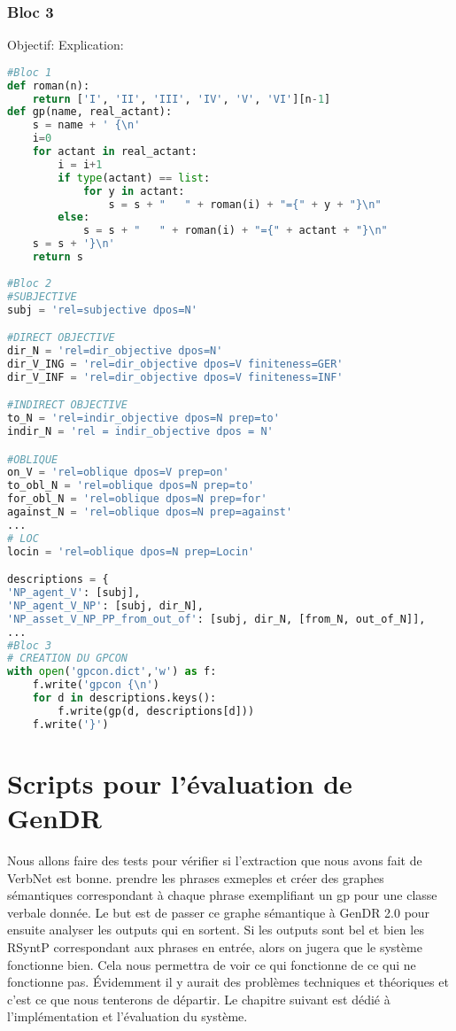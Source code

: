 \subsubsection{Bloc 3}
Objectif:
Explication:

\begin{lstlisting}[language=Python, caption = code pour gpcon.dict]
#Bloc 1
def roman(n):
    return ['I', 'II', 'III', 'IV', 'V', 'VI'][n-1]
def gp(name, real_actant):
    s = name + ' {\n'
    i=0
    for actant in real_actant:
        i = i+1
        if type(actant) == list:
            for y in actant:
                s = s + "   " + roman(i) + "={" + y + "}\n"
        else:
            s = s + "   " + roman(i) + "={" + actant + "}\n"
    s = s + '}\n'
    return s
		
#Bloc 2
#SUBJECTIVE
subj = 'rel=subjective dpos=N'

#DIRECT OBJECTIVE
dir_N = 'rel=dir_objective dpos=N'
dir_V_ING = 'rel=dir_objective dpos=V finiteness=GER'
dir_V_INF = 'rel=dir_objective dpos=V finiteness=INF'

#INDIRECT OBJECTIVE
to_N = 'rel=indir_objective dpos=N prep=to'
indir_N = 'rel = indir_objective dpos = N'

#OBLIQUE
on_V = 'rel=oblique dpos=V prep=on'
to_obl_N = 'rel=oblique dpos=N prep=to' 
for_obl_N = 'rel=oblique dpos=N prep=for'
against_N = 'rel=oblique dpos=N prep=against'
...
# LOC
locin = 'rel=oblique dpos=N prep=Locin'

descriptions = {
'NP_agent_V': [subj],
'NP_agent_V_NP': [subj, dir_N],
'NP_asset_V_NP_PP_from_out_of': [subj, dir_N, [from_N, out_of_N]],
...
#Bloc 3
# CREATION DU GPCON
with open('gpcon.dict','w') as f:
    f.write('gpcon {\n')
    for d in descriptions.keys():
        f.write(gp(d, descriptions[d]))
    f.write('}')
\end{lstlisting}

\section{Scripts pour l'évaluation de GenDR}

Nous allons faire des tests pour vérifier si l'extraction que nous avons fait de VerbNet est bonne. prendre les phrases exmeples et créer des graphes sémantiques correspondant à chaque phrase exemplifiant un gp pour une classe verbale donnée. Le but est de passer ce graphe sémantique à GenDR 2.0 pour ensuite analyser les outputs qui en sortent. Si les outputs sont bel et bien les RSyntP correspondant aux phrases en entrée, alors on jugera que le système fonctionne bien. Cela nous permettra de voir ce qui fonctionne de ce qui ne fonctionne pas. Évidemment il y aurait des problèmes techniques et théoriques et c'est ce que nous tenterons de départir. Le chapitre suivant est dédié à l'implémentation et l'évaluation du système.

